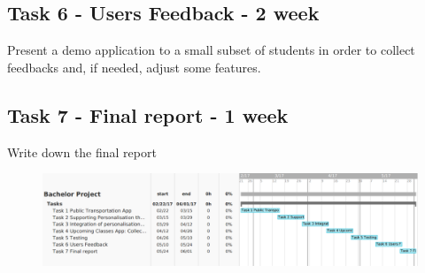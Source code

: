 \documentclass[11pt]{report}
\begin{document}
\subsection*{Task 6 - Users Feedback - 2 week}
Present a demo application to a small subset of students in order to collect feedbacks and, if needed, adjust some features.
\subsection*{Task 7 - Final report - 1 week}
Write down the final report
\begin{figure}[h]
\includegraphics[scale=0.4]{1.png}
\end{figure}
\end{document}
